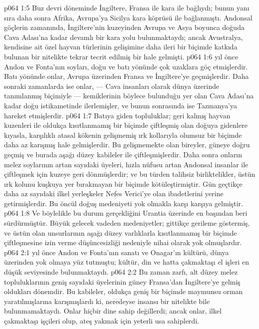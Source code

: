 \vs p064 1:5 Buz devri döneminde İngiltere, Fransa ile kara ile bağlıydı; bunun yanı sıra daha sonra Afrika, Avrupa’ya Sicilya kara köprüsü ile bağlanmıştı. Andonsal göçlerin zamanında, İngiltere’nin kuzeyinden Avrupa ve Asya boyunca doğuda Cava Adası’na kadar devamlı bir kara yolu bulunmaktaydı; ancak Avustralya, kendisine ait özel hayvan türlerinin gelişimine daha ileri bir biçimde katkıda bulunan bir nitelikte tekrar tecrit edilmiş bir hale gelmişti.
\vs p064 1:6  yıl önce Andon ve Fonta’nın soyları, doğu ve batı yönünde çok uzaklara göç etmişlerdir. Batı yönünde onlar, Avrupa üzerinden Fransa ve İngiltere’ye geçmişlerdir. Daha sonraki zamanlarda ise onlar, --- Cava insanları olarak dünya üzerinde tanımlanmış biçimiyle --- kemiklerinin böylece bulunduğu yer olan Cava Adası’na kadar doğu istikametinde ilerlemişler, ve bunun sonrasında ise Tazmanya’ya hareket etmişlerdir.
\vs p064 1:7 Batıya giden topluluklar; geri kalmış hayvan kuzenleri ile oldukça kısıtlanmamış bir biçimde çiftleşmiş olan doğuya gidenlere kıyasla, karşılıklı atasal kökenin gelişmemiş ırk kollarıyla olumsuz bir biçimde daha az karışmış hale gelmişlerdir. Bu gelişmemekte olan bireyler, güneye doğru geçmiş ve burada aşağı düzey kabileler ile çiftleşmişlerdir. Daha sonra onların melez soylarının artan sayıdaki üyeleri, hızla nüfusu artan Andonsal insanlar ile çiftleşmek için kuzeye geri dönmüşlerdir; ve bu türden talihsiz birliktelikler, üstün ırk kolunu kuşkuya yer bırakmayan bir biçimde kötüleştirmiştir. Gün geçtikçe daha az sayıdaki ilkel yerleşkeler Nefes Verici’ye olan ibadetlerini yerine getirmişlerdir. Bu öncül doğuş medeniyeti yok olmakla karşı karşıya gelmiştir.
\vs p064 1:8 Ve böylelikle bu durum gerçekliğini Urantia üzerinde en başından beri sürdürmüştür. Büyük gelecek vadeden medeniyetler; gittikçe gerileme göstermiş, ve üstün olan unsurlarının aşağı düzey varlıklarla kısıtlanmamış bir biçimde çiftleşmesine izin verme düşüncesizliği nedeniyle nihai olarak yok olmuşlardır.
\vs p064 2:1  yıl önce Andon ve Fonta’nın sanatı ve Onagar’ın kültürü, dünya üzerinden yok olmaya yüz tutmuştu; kültür, din ve hatta çakmaktaşı el işleri en düşük seviyesinde bulunmaktaydı.
\vs p064 2:2 Bu zaman zarfı, alt düzey melez topluluklarının geniş sayıdaki üyelerinin güney Fransa’dan İngiltere’ye gelmiş oldukları dönemdir. Bu kabileler, oldukça geniş bir biçimde maymunsu orman yaratılmışlarına karışmışlardı ki, neredeyse insansı bir nitelikte bile bulunmamaktaydı. Onlar hiçbir dine sahip değillerdi; ancak onlar, ilkel çakmaktaşı işçileri olup, ateş yakmak için yeterli usa sahiplerdi.
